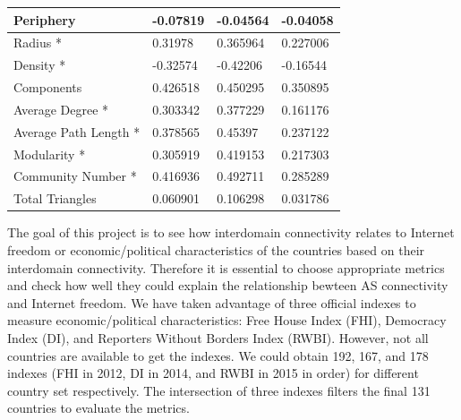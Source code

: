 \documentclass{article}
\begin{document}
\begin{table}[ht]
\begin{tabular}{|l|l|l|l|}
Periphery                                              & -0.07819     & -0.04564    & -0.04058      \\ \hline
Radius *                                               & 0.31978      & 0.365964    & 0.227006      \\ \hline
Density *                                               & -0.32574     & -0.42206    & -0.16544      \\ \hline
Components                                             & 0.426518     & 0.450295    & 0.350895      \\ \hline
Average Degree *                                        & 0.303342     & 0.377229    & 0.161176      \\ \hline
Average Path Length *                                   & 0.378565     & 0.45397     & 0.237122      \\ \hline
Modularity *                                            & 0.305919     & 0.419153    & 0.217303      \\ \hline
Community Number *                                      & 0.416936     & 0.492711    & 0.285289      \\ \hline
Total  Triangles                                       & 0.060901     & 0.106298    & 0.031786      \\ \hline
\end{tabular}
\end{table}

\noindent 
The goal of this project is to see how interdomain connectivity relates to
Internet freedom or economic/political characteristics of the countries based on
their interdomain connectivity. Therefore it is essential to choose appropriate
metrics and check how well they could explain the relationship bewteen AS
connectivity and Internet freedom. We have taken advantage of three official
indexes to measure economic/political characteristics: Free House Index (FHI),
Democracy Index (DI), and Reporters Without Borders Index (RWBI). However, not
all countries are available to get the indexes. We could obtain 192, 167, and
178 indexes (FHI in 2012, DI in 2014, and RWBI in 2015 in order) for different
country set respectively. The intersection of three indexes filters the final
131 countries to evaluate the metrics.

\bigskip
\end{document}
